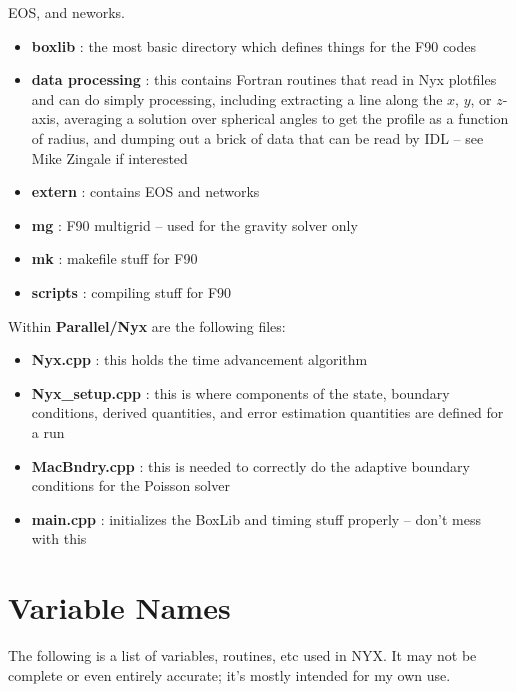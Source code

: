 \begin{itemize}
                        EOS, and neworks.
  \begin{itemize}
  \item {\bf boxlib}  : the most basic directory which defines things for the F90 codes
  \item {\bf data processing} : this contains Fortran routines that read in Nyx plotfiles and can do
                                simply processing, including extracting a line along the $x$, $y$, or $z$-axis,
                                averaging a solution over spherical angles to get the profile as a function
                                of radius, and dumping out a brick of data that can be read by IDL -- see 
                                Mike Zingale if interested
  \item {\bf extern}  : contains EOS and networks
  \item {\bf mg}      : F90 multigrid -- used for the gravity solver only
  \item {\bf mk}      : makefile stuff for F90
  \item {\bf scripts} : compiling stuff for F90
  \end{itemize}
\end{itemize}

Within {\bf Parallel/Nyx} are the following files:

  \begin{itemize}
  \item {\bf Nyx.cpp}           : this holds the time advancement algorithm 
  \item {\bf Nyx\_setup.cpp}    : this is where components of the state, boundary 
                                  conditions, derived quantities, and error estimation 
                                  quantities are defined for a run
  \item {\bf MacBndry.cpp}      : this is needed to correctly do the adaptive boundary 
                                  conditions for the Poisson solver
  \item {\bf main.cpp}          : initializes the BoxLib and timing stuff properly -- don't 
                                  mess with this
\end{itemize}
\section{Variable Names}
The following is a list of variables, routines, etc used in NYX. It may not be complete or even entirely accurate; it's mostly intended for my own use.\\

